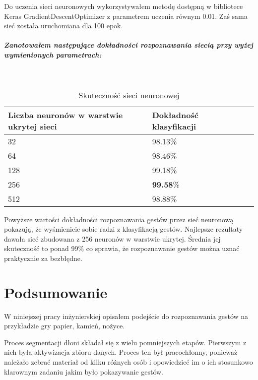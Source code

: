 \documentclass[a4paper,12pt,twoside,openany]{report}
\begin{document}
	Do uczenia sieci neuronowych wykorzystywałem metodę dostępną w bibliotece Keras GradientDescentOptimizer z parametrem uczenia równym 0.01. Zaś sama sieć została uruchomiana dla 100 epok. 
	
	\paragraph{Zanotowałem następujące dokładności rozpoznawania siecią przy wyżej wymienionych parametrach:}
	
	\mbox{}\\
	
	\begin{table}[H]
		\centering
		\begin{tabularx}{\textwidth}{|X|X|X|X|}
			\hline
			\textbf{Liczba neuronów w warstwie ukrytej sieci} & \textbf{Dokładność klasyfikacji} \\ 
			
			\hline
			32  & 98.13\% \\ 
			
			\hline
			64  & 98.46\% \\
			
			\hline
			128  & 99.18\% \\
			
			\hline
			256  & \textbf{99.58}\% \\
			
			\hline
			512  & 98.88\% \\
			
			\hline
		\end{tabularx}
		
		\caption{Skuteczność sieci neuronowej}
	\end{table}

	Powyższe wartości dokładności rozpoznawania gestów przez sieć neuronową pokazują, że wyśmienicie sobie radzi z klasyfikacją gestów. Najlepsze rezultaty dawała sieć zbudowana z 256 neuronów w warstwie ukrytej. Średnia jej skuteczność to ponad 99\% co sprawia, że rozpoznawanie gestów można uznać praktycznie za bezbłędne. 	

\chapter{Podsumowanie}
	W niniejszej pracy inżynierskiej opisałem podejście do rozpoznawania gestów na przykładzie gry papier, kamień, nożyce. 
	
	Proces segmentacji dłoni składał się z wielu pomniejszych etapów. Pierwszym z nich była aktywizacja zbioru danych. Proces ten był pracochłonny, ponieważ należało zebrać materiał od kilku różnych osób i opowiedzieć im o ich stosunkowo klarownym zadaniu jakim było pokazywanie gestów. 
	
\end{document}
